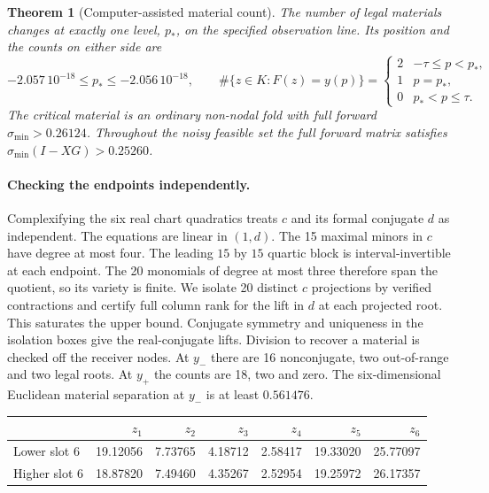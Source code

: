 \documentclass[10pt]{article}
\newtheorem{theorem}{Theorem}
\begin{document}
\begin{theorem}[Computer-assisted material count]\label{main}
The number of legal materials changes at exactly one level, $p_*$, on the specified observation line. Its position and the counts on either side are
\[
 -2.057\,10^{-18}\le p_*\le -2.056\,10^{-18},\qquad
 \#\{z\in K:F(z)=y(p)\}=
 \begin{cases}2&-\tau\le p<p_*,\\1&p=p_*,\\0&p_*<p\le\tau.\end{cases}
\]
The critical material is an ordinary non-nodal fold with full forward $\sigma_{\min}>0.26124$. Throughout the noisy feasible set the full forward matrix satisfies $\sigma_{\min}(I-XG)>0.25260$.
\end{theorem}

\paragraph{Checking the endpoints independently.}
Complexifying the six real chart quadratics treats $c$ and its formal conjugate $d$ as independent. The equations are linear in $(1,d)$. The 15 maximal minors in $c$ have degree at most four. The leading $15$ by $15$ quartic block is interval-invertible at each endpoint. The 20 monomials of degree at most three therefore span the quotient, so its variety is finite. We isolate 20 distinct $c$ projections by verified contractions and certify full column rank for the lift in $d$ at each projected root. This saturates the upper bound. Conjugate symmetry and uniqueness in the isolation boxes give the real-conjugate lifts. Division to recover a material is checked off the receiver nodes. At $y_-$ there are 16 nonconjugate, two out-of-range and two legal roots. At $y_+$ the counts are 18, two and zero. The six-dimensional Euclidean material separation at $y_-$ is at least $0.561476$.

\begin{center}\small
\begin{tabular}{lrrrrrr}
\toprule & $z_1$ & $z_2$ & $z_3$ & $z_4$ & $z_5$ & $z_6$\\\midrule
Lower slot 6 & 19.12056 & 7.73765 & 4.18712 & 2.58417 & 19.33020 & 25.77097\\
Higher slot 6 & 18.87820 & 7.49460 & 4.35267 & 2.52954 & 19.25972 & 26.17357\\\bottomrule
\end{tabular}
\end{center}
\end{document}

